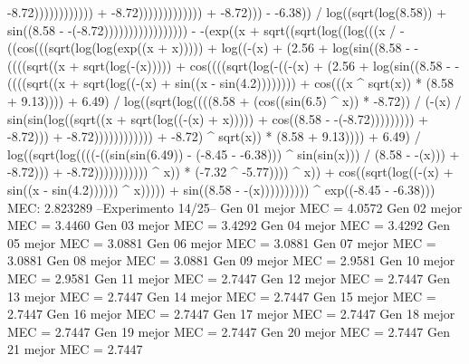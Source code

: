 -8.72)))))))))))) + -8.72))))))))))))) + -8.72))) - -6.38)) / log((sqrt(log(8.58)) + sin((8.58 - -(-8.72))))))))))))))))) - -(exp((x + sqrt((sqrt(log((log(((x / -((cos(((sqrt(log(log(exp((x + x))))) + log((-(x) + (2.56 + log(sin((8.58 - -((((sqrt((x + sqrt(log(-(x))))) + cos((((sqrt(log(-((-(x) + (2.56 + log(sin((8.58 - -((((sqrt((x + sqrt(log((-(x) + sin((x - sin(4.2)))))))) + cos(((x ^ sqrt(x)) * (8.58 + 9.13)))) + 6.49) / log((sqrt(log((((8.58 + (cos((sin(6.5) ^ x)) * -8.72)) / (-(x) / sin(sin(log((sqrt((x + sqrt(log((-(x) + x))))) + cos((8.58 - -(-8.72))))))))) + -8.72))) + -8.72)))))))))))) + -8.72) ^ sqrt(x)) * (8.58 + 9.13)))) + 6.49) / log((sqrt(log((((-((sin(sin(6.49)) - (-8.45 - -6.38))) ^ sin(sin(x))) / (8.58 - -(x))) + -8.72))) + -8.72))))))))))) ^ x)) * (-7.32 ^ -5.77)))) ^ x)) + cos((sqrt(log((-(x) + sin((x - sin(4.2)))))) ^ x))))) + sin((8.58 - -(x)))))))))) ^ exp((-8.45 - -6.38)))
MEC: 2.823289
--Experimento 
 14/25--
Gen 01 mejor MEC = 4.0572
Gen 02 mejor MEC = 3.4460
Gen 03 mejor MEC = 3.4292
Gen 04 mejor MEC = 3.4292
Gen 05 mejor MEC = 3.0881
Gen 06 mejor MEC = 3.0881
Gen 07 mejor MEC = 3.0881
Gen 08 mejor MEC = 3.0881
Gen 09 mejor MEC = 2.9581
Gen 10 mejor MEC = 2.9581
Gen 11 mejor MEC = 2.7447
Gen 12 mejor MEC = 2.7447
Gen 13 mejor MEC = 2.7447
Gen 14 mejor MEC = 2.7447
Gen 15 mejor MEC = 2.7447
Gen 16 mejor MEC = 2.7447
Gen 17 mejor MEC = 2.7447
Gen 18 mejor MEC = 2.7447
Gen 19 mejor MEC = 2.7447
Gen 20 mejor MEC = 2.7447
Gen 21 mejor MEC = 2.7447

